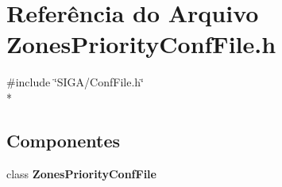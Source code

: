 \section{Referência do Arquivo Zones\+Priority\+Conf\+File.\+h}
\label{_zones_priority_conf_file_8h}
{\ttfamily \#include \char`\"{}S\+I\+G\+A/\+Conf\+File.\+h\char`\"{}}\\*
\subsection*{Componentes}
\begin{DoxyCompactItemize}
\item 
class {\bf Zones\+Priority\+Conf\+File}
\end{DoxyCompactItemize}
